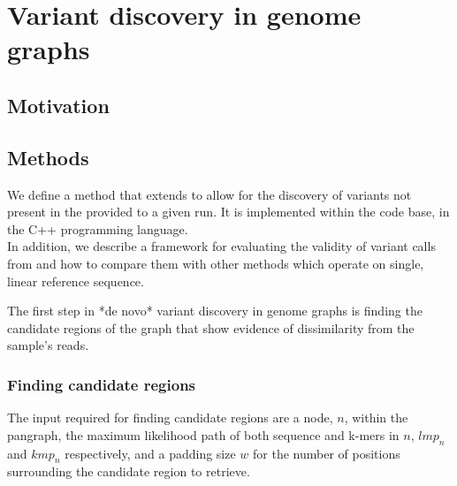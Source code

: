 
\chapter{Variant discovery in genome graphs}

\ifpdf
    \graphicspath{{Chapter1/Figs/Raster/}{Chapter1/Figs/PDF/}{Chapter1/Figs/}}
\else
    \graphicspath{{Chapter1/Figs/Vector/}{Chapter1/Figs/}}
\fi


\section{Motivation}

\section{Methods}

We define a method that extends \pandora{} to allow for the discovery of variants not present in the \prg{} provided to a given run. It is implemented within the \pandora{} code base, in the C++ programming language. \\
In addition, we describe a framework for evaluating the validity of variant calls from \pandora{} and how to compare them with other methods which operate on single, linear reference sequence.

The first step in *de novo* variant discovery in genome graphs is finding the candidate regions of the graph that show evidence of dissimilarity from the sample's reads.


\subsection{Finding candidate regions}

The input required for finding candidate regions are a node, $n$, within the \pandora{} pangraph, the maximum likelihood path of both sequence and k-mers in $n$, $lmp_n$ and $kmp_n$ respectively, and a padding size $w$ for the number of positions surrounding the candidate region to retrieve. \\

